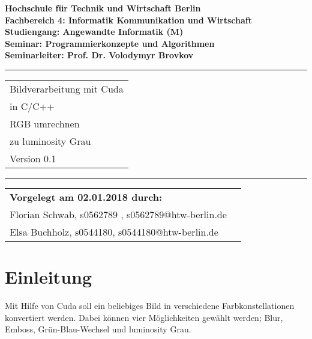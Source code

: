 \documentclass{llncs}
\begin{document}
	\lstset{language=c++, breaklines=true, frame=single}
\thispagestyle{empty}
\begin{flushleft}
\bfseries	Hochschule für Technik und Wirtschaft Berlin\\
	Fachbereich 4: Informatik Kommunikation und Wirtschaft \\
	Studiengang: Angewandte Informatik (M)\\
	Seminar: Programmierkonzepte und Algorithmen\\
	Seminarleiter: Prof. Dr. Volodymyr Brovkov\\ [2.5cm]
\end{flushleft}
\vspace{45pt}
\rule{\textwidth}{1pt}
\vspace{2pt}
\begin{flushright}
\Huge
\begin{tabular}{@{}l}
Bildverarbeitung mit Cuda\\ in C/C++\\
RGB umrechnen\\ zu luminosity Grau\\[6pt]
{\Large Version 0.1}
\end{tabular}
\end{flushright}
\rule{\textwidth}{1pt}
\vfill

\begin{flushleft}
\begin{tabular}{ll}
{\bfseries Vorgelegt am 02.01.2018 durch: }\\
Florian Schwab, s0562789 , s0562789@htw-berlin.de \\
Elsa Buchholz, s0544180, s0544180@htw-berlin.de \\
\end{tabular}
\end{flushleft}

%
\newpage
\tableofcontents
\newpage
%
\section{Einleitung}
%
Mit Hilfe von Cuda soll ein beliebiges Bild in verschiedene Farbkonstellationen konvertiert werden. Dabei können vier  Möglichkeiten gewählt werden; Blur, Emboss, Grün-Blau-Wechsel und luminosity Grau.\\
\end{document}
